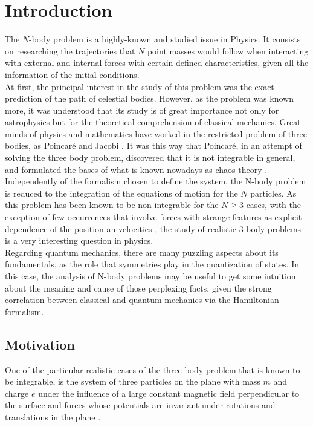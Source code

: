 \chapter{Introduction}
The $N$-body problem is a highly-known and studied issue in Physics. It consists on researching the trajectories that $N$ point masses would follow when interacting with external and internal forces with certain defined characteristics, given all the information of the initial conditions.\\

At first, the principal interest in the study of this problem was the exact prediction of the path of celestial bodies. However, as the problem was known more, it was understood that its study is of great importance not only for astrophysics but for the theoretical comprehension of classical mechanics. Great minds of physics and mathematics have worked in the restricted problem of three bodies, as Poincar\'e \cite{introPoincare} and Jacobi \cite{introJacobi}. It was this way that Poincar\'e, in an attempt of solving the three body problem, discovered that it is not integrable in general, and formulated the bases of what is known nowadays as chaos theory \cite{introPoincare}.\\

Independently of the formalism chosen to define the system, the N-body problem is reduced to the integration of the equations of motion for the $N$ particles. As this problem has been known to be non-integrable for the $N\geq 3$ cases, with the exception of few occurrences that involve forces with strange features as explicit dependence of the position an velocities \cite{strangeCases}, the study of realistic 3 body problems is a very interesting question in physics.\\

Regarding quantum mechanics, there are many puzzling aspects about its fundamentals, as the role that symmetries play in the quantization of states. In this case, the analysis of N-body problems may be useful to get some intuition about the meaning and cause of those perplexing facts, given the strong correlation between classical and quantum mechanics via the Hamiltonian formalism.

\section{Motivation}
One of the particular realistic cases of the three body problem that is known to be integrable, is the system of three particles on the plane with mass $m$ and charge $e$ under the influence of a large constant magnetic field perpendicular to the surface and forces whose potentials are invariant under rotations and translations in the plane \cite{alonso}.\\

